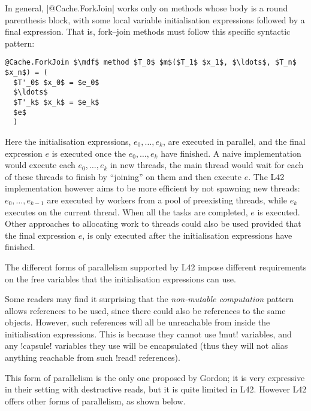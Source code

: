 In general, \Q|@Cache.ForkJoin| works only on methods whose body is a round parenthesis block, with some local variable initialisation expressions followed by a final expression.
That is, fork--join methods must follow this specific syntactic pattern:
\begin{lstlisting}[deletekeywords=label]
@Cache.ForkJoin $\mdf$ method $T_0$ $m$($T_1$ $x_1$, $\ldots$, $T_n$ $x_n$) = (
  $T'_0$ $x_0$ = $e_0$
  $\ldots$
  $T'_k$ $x_k$ = $e_k$
  $e$
  )
\end{lstlisting}
Here the initialisation expressions, $e_0,\ldots,e_k$, are executed in parallel, and the final expression $e$ is executed once the $e_0,\ldots,e_k$ have finished.
A naive implementation would execute each $e_0,\ldots,e_k$ in new threads, the main thread would wait for each of these threads to finish by ``joining'' on them and then execute $e$.
The L42 implementation however aims to be more efficient by not spawning new threads: $e_0,\ldots,e_{k-1}$ are executed by workers from a pool of preexisting threads,
while $e_k$ executes on the current thread. When all the tasks are completed, $e$ is executed.
Other approaches to allocating work to threads could also be used provided that the final expression $e$, is only executed after the initialisation expressions have finished.

The different forms of parallelism supported by L42 impose different requirements on the free variables that the initialisation expressions can use.

Some readers may find it surprising that the \emph{non-mutable computation} pattern allows \Q@read@ references to be used, since there could also be \Q@mut@ references to the same objects.
However, such \Q@mut@ references will all be unreachable from inside the initialisation expressions. This is because they cannot use \Q!mut! variables, and any \Q!capsule! variables they use will be encapsulated (thus they will not alias anything reachable from such \Q!read! references).

This form of parallelism is the only one proposed by Gordon; it is very expressive in their setting with destructive reads, but it is quite limited in L42. However L42 offers other forms of parallelism, as shown below.



